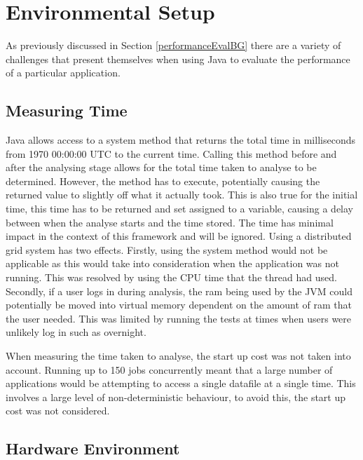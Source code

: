 \section{Environmental Setup}

As previously discussed in Section \ref{performanceEvalBG} there are a variety of challenges that present themselves when using Java to evaluate the performance of a particular application. 

\subsection{Measuring Time}
Java allows access to a system method that returns the total time in milliseconds from 1970 00:00:00 UTC to the current time. Calling this method before and after the analysing stage allows for the total time taken to analyse to be determined. However, the method has to execute, potentially causing the returned value to slightly off what it actually took. This is also true for the initial time, this time has to be returned and set assigned to a variable, causing a delay between when the analyse starts and the time stored. The time has minimal impact in the context of this framework and will be ignored. Using a distributed grid system has two effects. Firstly, using the system method would not be applicable as this would take into consideration when the application was not running. This was resolved by using the CPU time that the thread had used. Secondly, if a user logs in during analysis, the ram being used by the JVM could potentially be moved into virtual memory dependent on the amount of ram that the user needed. This was limited by running the tests at times when users were unlikely log in such as overnight.

When measuring the time taken to analyse, the start up cost was not taken into account. Running up to 150 jobs concurrently meant that a large number of applications would be attempting to access a single datafile at a single time. This involves a large level of non-deterministic behaviour, to avoid this, the start up cost was not considered.

\subsection{Hardware Environment}
